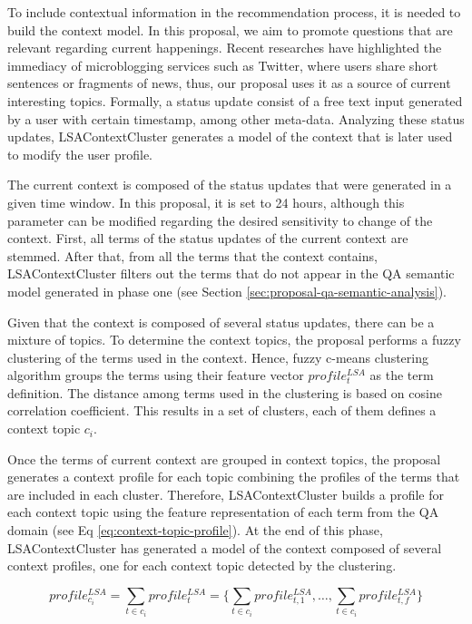 \documentclass[preprint]{elsarticle}
\begin{document}
\begin{spacing}{1.5}
To include contextual information in the recommendation process, it is needed to build the context model. In this proposal, we aim to promote questions that are relevant regarding current happenings. Recent researches \cite{Hermida2010} have highlighted the immediacy of microblogging services such as Twitter, where users share short sentences or fragments of news, thus, our proposal uses it as a source of current interesting topics. Formally, a status update consist of a free text input generated by a user with certain timestamp, among other meta-data. Analyzing these status updates, LSAContextCluster generates a model of the context that is later used to modify the user profile.

The current context is composed of the status updates that were generated in a given time window. In this proposal, it is set to 24 hours, although this parameter can be modified regarding the desired sensitivity to change of the context. First, all terms of the status updates of the current context are stemmed. After that, from all the terms that the context contains, LSAContextCluster filters out the terms that do not appear in the QA semantic model generated in phase one (see Section \ref{sec:proposal-qa-semantic-analysis}).

Given that the context is composed of several status updates, there can be a mixture of topics. To determine the context topics, the proposal performs a fuzzy clustering of the terms used in the context. Hence, fuzzy c-means clustering algorithm \cite{Bezdek1984} groups the terms using their feature vector $profile^{LSA}_t$ as the term definition. The distance among terms used in the clustering is based on cosine correlation coefficient. This results in a set of clusters, each of them defines a context topic $c_i$.

Once the terms of current context are grouped in context topics, the proposal generates a context profile for each topic combining the profiles of the terms that are included in each cluster. Therefore, LSAContextCluster builds a profile for each context topic using the feature representation of each term from the QA domain (see Eq \ref{eq:context-topic-profile}). At the end of this phase, LSAContextCluster has generated a model of the context composed of several context profiles, one for each context topic detected by the clustering.

\begin{equation}
	profile^{LSA}_{c_i} = \sum_{t \in c_i} profile^{LSA}_{t}=\{\sum_{t \in c_i} profile^{LSA}_{t,1}, \dots, \sum_{t \in c_i} profile^{LSA}_{t,f} \}
	\label{eq:context-topic-profile}
\end{equation}



\end{spacing}
\end{document}
